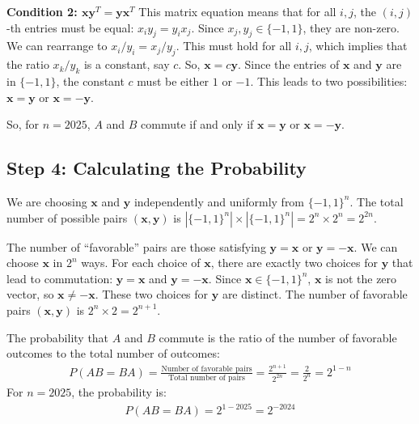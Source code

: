 \documentclass[12pt,a4paper]{article}
\theoremstyle{definition}
\begin{document}
        \textbf{Condition 2: $\mathbf{x}\mathbf{y}^T = \mathbf{y}\mathbf{x}^T$}
        This matrix equation means that for all $i,j$, the $(i,j)$-th entries must be equal: $x_i y_j = y_i x_j$.
        Since $x_j, y_j \in \{-1, 1\}$, they are non-zero. We can rearrange to $x_i/y_i = x_j/y_j$. This must hold for all $i,j$, which implies that the ratio $x_k/y_k$ is a constant, say $c$. So, $\mathbf{x} = c\mathbf{y}$.
        Since the entries of $\mathbf{x}$ and $\mathbf{y}$ are in $\{-1, 1\}$, the constant $c$ must be either $1$ or $-1$. This leads to two possibilities: $\mathbf{x} = \mathbf{y}$ or $\mathbf{x} = -\mathbf{y}$.

        So, for $n=2025$, $A$ and $B$ commute if and only if $\mathbf{x}=\mathbf{y}$ or $\mathbf{x}=-\mathbf{y}$.

        \subsection*{Step 4: Calculating the Probability}

        We are choosing $\mathbf{x}$ and $\mathbf{y}$ independently and uniformly from $\{-1, 1\}^n$.
        The total number of possible pairs $(\mathbf{x}, \mathbf{y})$ is $|\{-1, 1\}^n| \times |\{-1, 1\}^n| = 2^n \times 2^n = 2^{2n}$.

        The number of ``favorable'' pairs are those satisfying $\mathbf{y}=\mathbf{x}$ or $\mathbf{y}=-\mathbf{x}$.
        We can choose $\mathbf{x}$ in $2^n$ ways. For each choice of $\mathbf{x}$, there are exactly two choices for $\mathbf{y}$ that lead to commutation: $\mathbf{y}=\mathbf{x}$ and $\mathbf{y}=-\mathbf{x}$. Since $\mathbf{x} \in \{-1,1\}^n$, $\mathbf{x}$ is not the zero vector, so $\mathbf{x} \neq -\mathbf{x}$. These two choices for $\mathbf{y}$ are distinct.
        The number of favorable pairs $(\mathbf{x}, \mathbf{y})$ is $2^n \times 2 = 2^{n+1}$.

        The probability that $A$ and $B$ commute is the ratio of the number of favorable outcomes to the total number of outcomes:
        \begin{align}
            P(AB=BA) = \frac{\text{Number of favorable pairs}}{\text{Total number of pairs}} = \frac{2^{n+1}}{2^{2n}} = \frac{2}{2^n} = 2^{1-n}
        \end{align}
        For $n=2025$, the probability is:
        \begin{align}
            P(AB=BA) = 2^{1-2025} = 2^{-2024}
        \end{align}
\end{document}
